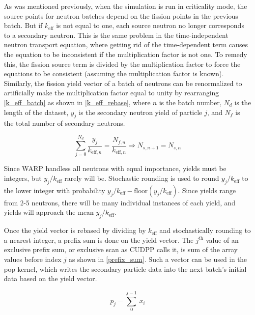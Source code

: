 
As was mentioned previously, when the simulation is run in criticality mode, the source points for neutron batches depend on the fission points in the previous batch.  But if $k_\mathrm{eff}$ is not equal to one, each source neutron no longer corresponds to a secondary neutron.  This is the same problem in the time-independent neutron transport equation, where getting rid of the time-dependent term causes the equation to be inconsistent if the multiplication factor is not one.  To remedy this, the fission source term is divided by the multiplication factor to force the equations to be consistent (assuming the multiplication factor is known).  Similarly, the fission yield vector of a batch of neutrons can be renormalized to artificially make the multiplication factor equal to unity by rearranging \eqref{k_eff_batch} as shown in \eqref{k_eff_rebase}, where $n$ is the batch number, $N_d$ is the length of the dataset, $y_j$ is the secondary neutron yield of particle $j$, and $N_f$ is the total number of secondary neutrons.%

\begin{equation}
\label{k_eff_rebase}
\sum_{j=0}^{N_d}  \frac{y_j }{k_{\mathrm{eff},n}} = \frac{N_{f,n}}{k_{\mathrm{eff},n}} \Rightarrow N_{s,n+1} = N_{s,n}
\end{equation}

Since WARP handless all neutrons with equal importance, yields must be integers, but $y_j/k_\mathrm{eff}$ rarely will be.  Stochastic rounding is used to round $y_j/k_\mathrm{eff}$ to the lower integer with probability $y_j/k_\mathrm{eff} - \mathrm{floor}(y_j/k_\mathrm{eff})$.  Since yields range from 2-5 neutrons, there will be many individual instances of each yield, and yields will approach the mean $y_j/k_\mathrm{eff}$.

Once the yield vector is rebased by dividing by $k_\mathrm{eff}$ and stochastically rounding to a nearest integer, a prefix sum is done on the yield vector.  The $j^{\text{th}}$ value of an exclusive prefix sum, or exclusive scan as CUDPP calls it, is sum of the array values before index $j$ as shown in \eqref{prefix_sum}.  Such a vector can be used in the pop kernel, which writes the secondary particle data into the next batch's initial data based on the yield vector.

\begin{equation}
p_j = \sum_0^{j-1} \: x_i
\label{prefix_sum}
\end{equation}

